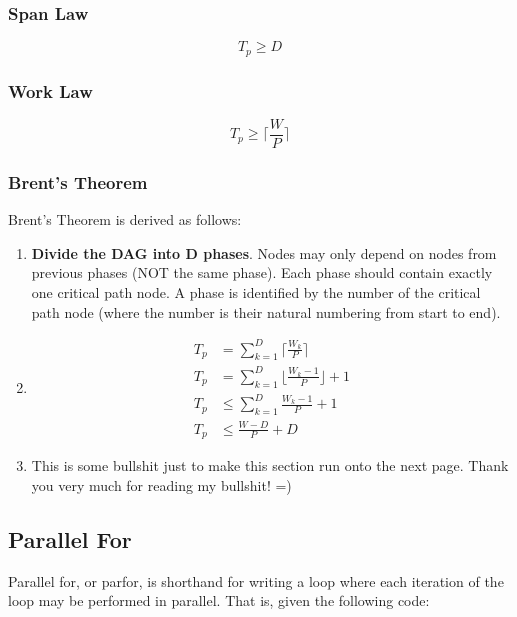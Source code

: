 \documentclass{standalone}
\begin{document}
\subsubsection{Span Law}
\[T_p \geq D\]

\subsubsection{Work Law}
\[T_p \geq \lceil \frac{W}{P} \rceil\]

\subsubsection{Brent's Theorem}
Brent's Theorem is derived as follows:

\begin{enumerate}
	\item \textbf{Divide the DAG into D phases}. Nodes may only depend on nodes from previous phases (NOT the same phase). Each phase should contain exactly one critical path node. A phase is identified by the number of the critical path node (where the number is their natural numbering from start to end).
	\item \begin{align*}
		T_p &= \sum_{k=1}^D \lceil\frac{W_k}{P}\rceil\\
		T_p &= \sum_{k=1}^D \lfloor\frac{W_k - 1}{P}\rfloor + 1\\
		T_p &\leq \sum_{k=1}^D \frac{W_k - 1}{P} + 1\\
		T_p &\leq \frac{W - D}{P} + D
  \end{align*}
	\item This is some bullshit just to make this section run onto the next page. Thank you very much for reading my bullshit! =)
\end{enumerate}

\subsection{Parallel For}
Parallel for, or parfor, is shorthand for writing a loop where each iteration of the loop may be performed in parallel. That is, given the following code:
\end{document}
